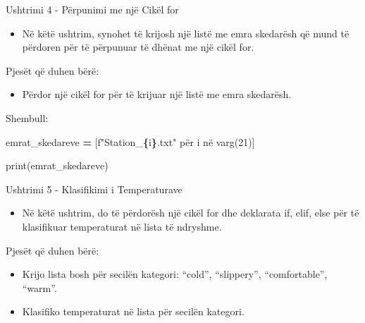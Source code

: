\documentclass[
  ignorenonframetext,
]{beamer}
\newenvironment{Shaded}{\begin{snugshade}}{\end{snugshade}}
\newcommand{\BuiltInTok}[1]{#1}
\newcommand{\DecValTok}[1]{\textcolor[rgb]{0.00,0.00,0.81}{#1}}
\newcommand{\NormalTok}[1]{#1}
\newcommand{\OperatorTok}[1]{\textcolor[rgb]{0.81,0.36,0.00}{\textbf{#1}}}
\newcommand{\SpecialCharTok}[1]{\textcolor[rgb]{0.81,0.36,0.00}{\textbf{#1}}}
\newcommand{\SpecialStringTok}[1]{\textcolor[rgb]{0.31,0.60,0.02}{#1}}
\providecommand{\tightlist}{%
  \setlength{\itemsep}{0pt}\setlength{\parskip}{0pt}}
\begin{document}
\begin{frame}{Ushtrimi 4 - Përpunimi me një Cikël for}
\protect\hypertarget{ushtrimi-4---puxebrpunimi-me-njuxeb-cikuxebl-for}{}
\begin{itemize}
\tightlist
\item
  Në këtë ushtrim, synohet të krijosh një listë me emra skedarësh që
  mund të përdoren për të përpunuar të dhënat me një cikël for.
\end{itemize}
\end{frame}

\begin{frame}{Pjesët që duhen bërë:}
\protect\hypertarget{pjesuxebt-quxeb-duhen-buxebruxeb-3}{}
\begin{itemize}
\tightlist
\item
  Përdor një cikël for për të krijuar një listë me emra skedarësh.
\end{itemize}
\end{frame}

\begin{frame}[fragile]{Shembull:}
\protect\hypertarget{shembull-5}{}
\begin{Shaded}
\begin{Highlighting}[]
\NormalTok{emrat\_skedareve }\OperatorTok{=}\NormalTok{ [}\SpecialStringTok{f"Station\_}\SpecialCharTok{\{}\NormalTok{i}\SpecialCharTok{\}}\SpecialStringTok{.txt"}\NormalTok{ për i në varg(}\DecValTok{21}\NormalTok{)]}

\BuiltInTok{print}\NormalTok{(emrat\_skedareve)}
\end{Highlighting}
\end{Shaded}
\end{frame}

\begin{frame}{Ushtrimi 5 - Klasifikimi i Temperaturave}
\protect\hypertarget{ushtrimi-5---klasifikimi-i-temperaturave}{}
\begin{itemize}
\tightlist
\item
  Në këtë ushtrim, do të përdorësh një cikël for dhe deklarata if, elif,
  else për të klasifikuar temperaturat në lista të ndryshme.
\end{itemize}
\end{frame}

\begin{frame}{Pjesët që duhen bërë:}
\protect\hypertarget{pjesuxebt-quxeb-duhen-buxebruxeb-4}{}
\begin{itemize}
\item
  Krijo lista bosh për secilën kategori: ``cold'', ``slippery'',
  ``comfortable'', ``warm''.
\item
  Klasifiko temperaturat në lista për secilën kategori.
\end{itemize}
\end{frame}
\end{document}
